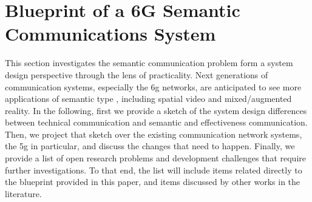 

\section{Blueprint of a 6G Semantic Communications System }
\label{sec:blueprint}


This section investigates the semantic communication problem form a system design perspective through the lens of practicality. Next generations of communication systems, especially the \gls{6g} networks, are anticipated to see more applications of semantic  type \cite{saad2024foundations}, including spatial video and mixed/augmented reality. In the following, first we provide a sketch of the system design differences between  technical communication and  semantic and effectiveness communication. Then, we project that sketch over the existing communication network systems, the \gls{5g} in particular, and discuss the changes that need to happen. Finally, we provide a list of open research problems and development challenges that require further investigations. To that end, the list will include items related directly to the blueprint  provided in this paper, and  items discussed by other works in the literature.

